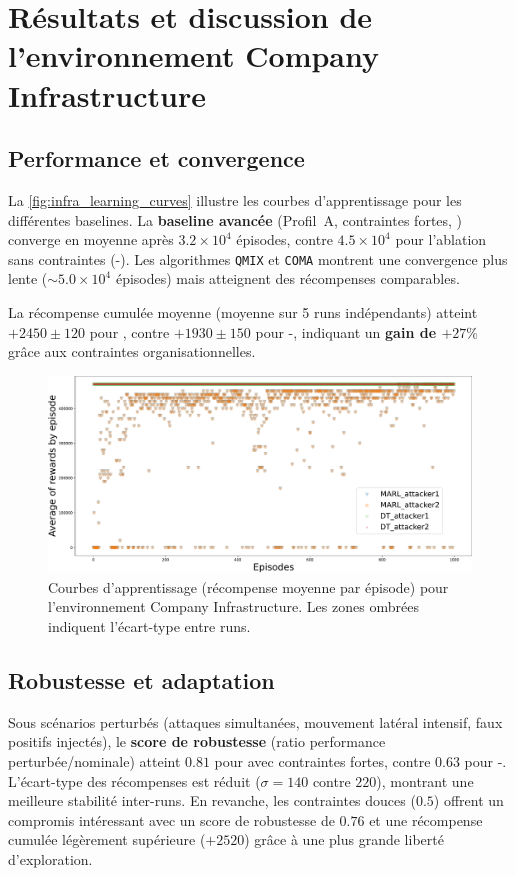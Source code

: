 \section{Résultats et discussion de l'environnement \textbf{Company Infrastructure}}\label{sec:results_and_discussion_infra}

\subsection*{Performance et convergence}

La \autoref{fig:infra_learning_curves} illustre les courbes d'apprentissage pour les différentes baselines.
La \textbf{baseline avancée} (Profil~A, contraintes fortes, ) converge en moyenne après $3.2 \times 10^4$ épisodes, contre $4.5 \times 10^4$ pour l'ablation sans contraintes (-).
Les algorithmes \texttt{QMIX} et \texttt{COMA} montrent une convergence plus lente ($\sim 5.0 \times 10^4$ épisodes) mais atteignent des récompenses comparables.

La récompense cumulée moyenne (moyenne sur 5 runs indépendants) atteint $+2450 \pm 120$ pour , contre $+1930 \pm 150$ pour -, indiquant un \textbf{gain de $+27\%$} grâce aux contraintes organisationnelles.

\begin{figure}[h!]
  \centering
  \includegraphics[width=0.75\linewidth]{figures/results_infra_learning.pdf}
  \caption{Courbes d'apprentissage (récompense moyenne par épisode) pour l'environnement Company Infrastructure. Les zones ombrées indiquent l'écart-type entre runs.}
  \label{fig:infra_learning_curves}
\end{figure}

\subsection*{Robustesse et adaptation}

Sous scénarios perturbés (attaques simultanées, mouvement latéral intensif, faux positifs injectés), le \textbf{score de robustesse} (ratio performance perturbée/nominale) atteint $0.81$ pour  avec contraintes fortes, contre $0.63$ pour -.
L'écart-type des récompenses est réduit ($\sigma = 140$ contre $220$), montrant une meilleure stabilité inter-runs.
En revanche, les contraintes douces ($0.5$) offrent un compromis intéressant avec un score de robustesse de $0.76$ et une récompense cumulée légèrement supérieure ($+2520$) grâce à une plus grande liberté d’exploration.

